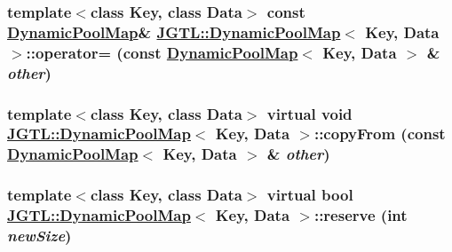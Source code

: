 \hypertarget{class_j_g_t_l_1_1_dynamic_pool_map_36d6be1323ed844a5d93ddf9814cc059}{
\subsubsection[operator=]{\setlength{\rightskip}{0pt plus 5cm}template$<$class Key, class Data$>$ const \hyperlink{class_j_g_t_l_1_1_dynamic_pool_map}{Dynamic\-Pool\-Map}\& \hyperlink{class_j_g_t_l_1_1_dynamic_pool_map}{JGTL::Dynamic\-Pool\-Map}$<$ Key, Data $>$::operator= (const \hyperlink{class_j_g_t_l_1_1_dynamic_pool_map}{Dynamic\-Pool\-Map}$<$ Key, Data $>$ \& {\em other})}}
\label{class_j_g_t_l_1_1_dynamic_pool_map_36d6be1323ed844a5d93ddf9814cc059}


\hypertarget{class_j_g_t_l_1_1_dynamic_pool_map_bce0771b0a4cc6238e7e3e24f5ec3bf0}{
\subsubsection[copyFrom]{\setlength{\rightskip}{0pt plus 5cm}template$<$class Key, class Data$>$ virtual void \hyperlink{class_j_g_t_l_1_1_dynamic_pool_map}{JGTL::Dynamic\-Pool\-Map}$<$ Key, Data $>$::copy\-From (const \hyperlink{class_j_g_t_l_1_1_dynamic_pool_map}{Dynamic\-Pool\-Map}$<$ Key, Data $>$ \& {\em other})}}
\label{class_j_g_t_l_1_1_dynamic_pool_map_bce0771b0a4cc6238e7e3e24f5ec3bf0}


\hypertarget{class_j_g_t_l_1_1_dynamic_pool_map_28192d8477398c5a94b3ca80fc366076}{
\subsubsection[reserve]{\setlength{\rightskip}{0pt plus 5cm}template$<$class Key, class Data$>$ virtual bool \hyperlink{class_j_g_t_l_1_1_dynamic_pool_map}{JGTL::Dynamic\-Pool\-Map}$<$ Key, Data $>$::reserve (int {\em new\-Size})}}
\label{class_j_g_t_l_1_1_dynamic_pool_map_28192d8477398c5a94b3ca80fc366076}




